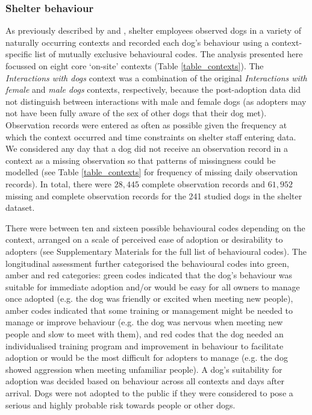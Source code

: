 \documentclass[12pt]{article}
\begin{document}
\subsubsection{Shelter behaviour}
As previously described by \textcite{goold2017modelling} and \textcite{goold2017aggressiveness}, shelter employees observed dogs in a variety of naturally occurring contexts and recorded each dog's behaviour using a context-specific list of mutually exclusive behavioural codes. The analysis presented here focussed on eight core ‘on-site' contexts (Table \ref{table_contexts}). The \textit{Interactions with dogs} context was a combination of the original \textit{Interactions with female} and \textit{male dogs} contexts, respectively, because the post-adoption data did not distinguish between interactions with male and female dogs (as adopters may not have been fully aware of the sex of other dogs that their dog met). Observation records were entered as often as possible given the frequency at which the context occurred and time constraints on shelter staff entering data. We considered any day that a dog did not receive an observation record in a context as a missing observation so that patterns of missingness could be modelled (see Table \ref{table_contexts} for frequency of missing daily observation records). In total, there were $28,445$ complete observation records and $61,952$ missing and complete observation records for the 241 studied dogs in the shelter dataset.

There were between ten and sixteen possible behavioural codes depending on the context, arranged on a scale of perceived ease of adoption or desirability to adopters (see Supplementary Materials for the full list of behavioural codes). The longitudinal assessment further categorised the behavioural codes into green, amber and red categories: green codes indicated that the dog's behaviour was suitable for immediate adoption and/or would be easy for all owners to manage once adopted (e.g. the dog was friendly or excited when meeting new people), amber codes indicated that some training or management might be needed to manage or improve behaviour (e.g. the dog was nervous when meeting new people and slow to meet with them), and red codes that the dog needed an individualised training program and improvement in behaviour to facilitate adoption or would be the most difficult for adopters to manage (e.g. the dog showed aggression when meeting unfamiliar people). A dog's suitability for adoption was decided based on behaviour across all contexts and days after arrival. Dogs were not adopted to the public if they were considered to pose a serious and highly probable risk towards people or other dogs.
\end{document}

